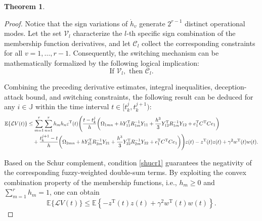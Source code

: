 \documentclass[preprint,review,fleqn,sort&compress,3p]{elsarticle}
\theoremstyle{definition} %
\theoremstyle{definition}%
\newtheorem{thm}{Theorem}[section]
\begin{document}
\begin{thm}
\begin{proof}
Notice that the sign variations of $\dot{h}_v$ generate $2^{r-1}$ distinct operational modes. Let the set $\mathcal{V}_l$ characterize the $l$-th specific sign combination of the membership function derivatives, and let $\mathcal{C}_l$ collect the corresponding constraints for all $v=1,\ldots,r-1$. Consequently, the switching mechanism can be mathematically formalized by the following logical implication:
\begin{equation}
	\text{If } \mathcal{V}_l, \text{ then } \mathcal{C}_l. \label{eq_if_then_2}
\end{equation}

Combining the preceding derivative estimates, integral inequalities, deception-attack bound, and switching constraints, the following result can be deduced for any $i \in \mathbb{J}$ within the time interval $t \in [t_k^j, t_k^{j+1})$:
\begin{align}
	\mathbb{E}\{\mathcal{L}V(t)\}
	&\leq
	\sum_{m=1}^{r} \sum_{n=1}^{r} h_m h_n \varepsilon^\mathrm{T}(t) \Bigg( 
	\frac{t - t_k^j}{h} \bigg( 
	\Omega_{1mn} 
	+ h  Y_{11}^{\mathrm{T}} R_{1m}^{-1} Y_{11} 
	+ \frac{h^3}{3} Y_{12}^{\mathrm{T}} R_{1m}^{-1} Y_{12}
	+ e_{1}^{\mathrm{T}} C^{\mathrm{T}}C e_1 \bigg) \notag \\
	&\quad + \frac{t_{k}^{j+1} - t}{h} \bigg( 
	\Omega_{2mn} 
	+ h Y_{21}^{\mathrm{T}} R_{2m}^{-1} Y_{21} 
	+ \frac{h^3}{3} Y_{22}^{\mathrm{T}} R_{2m}^{-1} Y_{22}
	+ e_{1}^{\mathrm{T}} C^{\mathrm{T}}C e_1  
	\bigg) \Bigg) \varepsilon(t) 
	- z^{\mathrm{T}}(t)z(t) + \gamma^2 w^{\mathrm{T}}(t)w(t).
\end{align}

Based on the Schur complement, condition \eqref{shucr1} guarantees the negativity of the corresponding fuzzy-weighted double-sum terms. By exploiting the convex combination property of the membership functions, i.e., $h_m \ge 0$ and $\sum_{m=1}^{r} h_m = 1$, one can obtain
\begin{equation}
	\mathbb{E}\{\mathcal{L}V(t)\}
	\leq
	\mathbb{E} \left\{
	-z^{\mathrm{T}}(t)z(t)
	+\gamma^2 w^{\mathrm{T}}(t)w(t)
	\right\}.
\end{equation}


\end{proof}
\end{thm}
\end{document}
